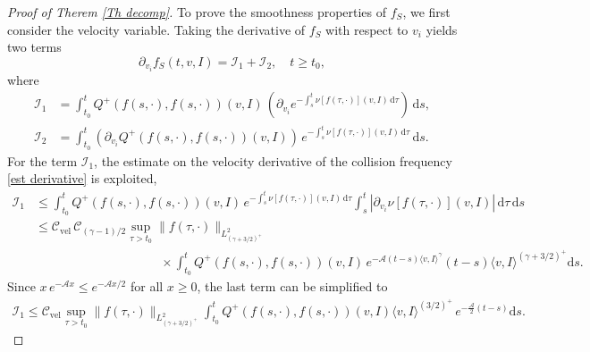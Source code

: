 \documentclass[11pt,a4paper]{amsart}
\newcommand{\md}{\mathrm{d}}
\newcommand{\g}{\gamma}
\newcommand{\la}{\langle}
\newcommand{\ra}{\rangle}
\newcommand{\cb}{\mathcal{C}}
\newcommand{\mA}{\mathcal{A}}
\newcommand{\fS}{f_S}
\newcommand{\Clvel}{\mathcal{C}_{\text{vel}}}
\begin{document}
\begin{proof}[Proof of Therem \ref{Th decomp}]
To prove the smoothness properties of $\fS$, we first consider  the velocity variable. 
Taking the derivative of $\fS$  with respect to $v_i$ yields two terms
\begin{equation}\label{fS v}
\partial_{v_i}	\fS(t,v,I) = \mathcal{I}_1 + \mathcal{I}_2, \quad t\geq t_0,
\end{equation}
where 
\begin{equation*}
	\begin{split}
		 \mathcal{I}_1  &  =  \int_{t_0}^t  Q^+(f(s,\cdot),f(s,\cdot))(v,I) \, \left( \partial_{v_i} e^{-\int_s^t 	\nu[f(\tau,\cdot)](v,I) \, \md \tau} \right) \, \md s, \\ 
\mathcal{I}_2 & =  \int_{t_0}^t \left(  \partial_{v_i} Q^+(f(s,\cdot),f(s,\cdot))(v,I) \right) \, e^{-\int_s^t 	\nu[f(\tau,\cdot)](v,I) \, \md \tau} \, \md s.
	\end{split}
\end{equation*}
For the term $\mathcal{I}_1  $,  the estimate on the velocity derivative of the collision frequency \eqref{est derivative} is exploited,  
\begin{equation*}
	\begin{split}
		\mathcal{I}_1  
		& \leq  \int_{t_0}^t  Q^+(f(s,\cdot),f(s,\cdot))(v,I) \,  e^{-\int_s^t 	\nu[f(\tau,\cdot)](v,I) \, \md \tau}    \int_s^t  \left| \partial_{v_i} 	\nu[f(\tau,\cdot)](v,I)  \right| \, \md \tau  \, \md s \\
		& \leq  \Clvel \, \cb_{(\g -1)/2} \sup_{\tau> t_0}	\| f(\tau,\cdot) \|_{L^{2}_{(\g+3/2)^+}}   \\ & \qquad \qquad \qquad  \qquad \qquad \times \int_{t_0}^t  Q^+(f(s,\cdot),f(s,\cdot))(v,I) \,  e^{- \mA (t-s)  \la v, I \ra^{\g}  }    (t-s) \la v, I \ra^{(\g+3/2)^+}    \md s.
	\end{split}
\end{equation*}
Since $ x \, e^{- \mA x } \leq e^{- \mA x/2 }$ for all $x\geq 0$, the last term can be simplified to
\begin{equation}\label{pomocna 2}
	\begin{split}
		\mathcal{I}_1  
	\leq \Clvel \sup_{\tau>t_0}	\| f(\tau,\cdot) \|_{L^{2}_{(\g+3/2)^+}}    \int_{t_0}^t  Q^+(f(s,\cdot),f(s,\cdot))(v,I) \la v, I \ra^{(3/2)^+}   \,  e^{- \frac{\mA}{2} (t-s)     }     \md s.

\end{split}
\end{equation}
\end{proof}
\end{document}
